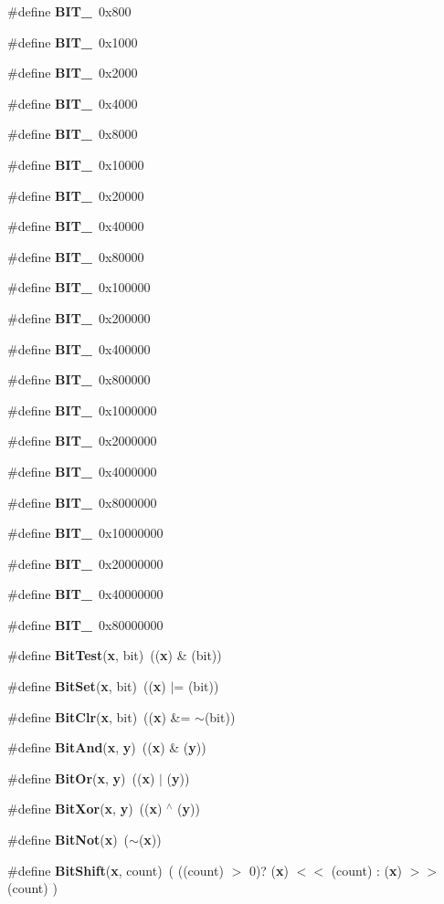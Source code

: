 \begin{CompactItemize}
\item 
\#define {\bf BIT\_}\ 0x800
\item 
\#define {\bf BIT\_}\ 0x1000
\item 
\#define {\bf BIT\_}\ 0x2000
\item 
\#define {\bf BIT\_}\ 0x4000
\item 
\#define {\bf BIT\_}\ 0x8000
\item 
\#define {\bf BIT\_}\ 0x10000
\item 
\#define {\bf BIT\_}\ 0x20000
\item 
\#define {\bf BIT\_}\ 0x40000
\item 
\#define {\bf BIT\_}\ 0x80000
\item 
\#define {\bf BIT\_}\ 0x100000
\item 
\#define {\bf BIT\_}\ 0x200000
\item 
\#define {\bf BIT\_}\ 0x400000
\item 
\#define {\bf BIT\_}\ 0x800000
\item 
\#define {\bf BIT\_}\ 0x1000000
\item 
\#define {\bf BIT\_}\ 0x2000000
\item 
\#define {\bf BIT\_}\ 0x4000000
\item 
\#define {\bf BIT\_}\ 0x8000000
\item 
\#define {\bf BIT\_}\ 0x10000000
\item 
\#define {\bf BIT\_}\ 0x20000000
\item 
\#define {\bf BIT\_}\ 0x40000000
\item 
\#define {\bf BIT\_}\ 0x80000000
\item 
\#define {\bf Bit\-Test}({\bf x}, bit)\ (({\bf x}) \& (bit))
\item 
\#define {\bf Bit\-Set}({\bf x}, bit)\ (({\bf x}) $|$= (bit))
\item 
\#define {\bf Bit\-Clr}({\bf x}, bit)\ (({\bf x}) \&= $\sim$(bit))
\item 
\#define {\bf Bit\-And}({\bf x}, {\bf y})\ (({\bf x}) \& ({\bf y}))
\item 
\#define {\bf Bit\-Or}({\bf x}, {\bf y})\ (({\bf x}) $|$ ({\bf y}))
\item 
\#define {\bf Bit\-Xor}({\bf x}, {\bf y})\ (({\bf x}) $^\wedge$ ({\bf y}))
\item 
\#define {\bf Bit\-Not}({\bf x})\ ($\sim$({\bf x}))
\item 
\#define {\bf Bit\-Shift}({\bf x}, count)\ ( ((count) $>$ 0)? ({\bf x}) $<$$<$ (count) : ({\bf x}) $>$$>$ (count) )

\end{CompactItemize}
